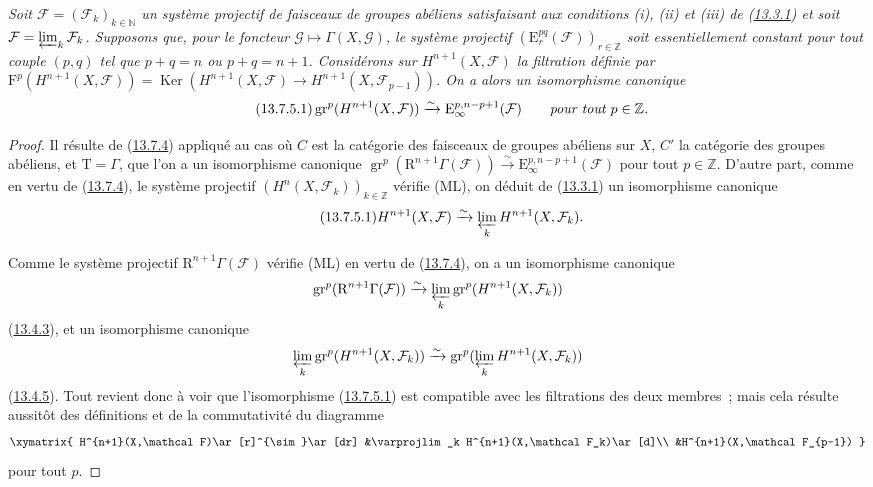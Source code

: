 \begin{corollary}[13.7.5]
\label{0.13.7.5-fr}
\emph{Soit $\mathcal F=(\mathcal F_k)_{k\in\mathbb N}$ un système
projectif de faisceaux de groupes abéliens satisfaisant aux conditions
\emph{(i)}, \emph{(ii)} et \emph{(iii)} de
(\hyperref[0.13.3.1-fr]{13.3.1}) et soit
$\mathcal F=\varprojlim_k\mathcal F_k$. Supposons que, pour le foncteur
$\mathcal G\mapsto\Gamma(X,\mathcal G)$, le système projectif
$(\mathrm E_r^{pq}(\mathcal F))_{r\in\mathbb Z}$ soit essentiellement
constant pour tout couple $(p,q)$ tel que $p+q=n$ ou $p+q=n+1$.
Considérons sur $H^{n+1}(X,\mathcal F)$ la filtration définie par
$\mathrm F^p(H^{n+1}(X,\mathcal F))=
\operatorname{Ker}(H^{n+1}(X,\mathcal F)\to
H^{n+1}(X,\mathcal F_{p-1}))$. On a alors un isomorphisme canonique}
\begin{equation}
\label{0.13.7.5.1-fr}
\tag{13.7.5.1}
\operatorname{gr}^p(H^{n+1}(X,\mathcal F))
\xrightarrow{\sim}\mathrm E_\infty^{p,n-p+1}(\mathcal F)
\qquad\emph{pour tout $p\in\mathbb Z$.}
\end{equation}
\end{corollary}
\begin{proof}
Il résulte de (\hyperref[0.13.7.4-fr]{13.7.4}) appliqué au cas où $C$
est la catégorie des faisceaux de groupes abéliens sur $X$, $C'$ la
catégorie des groupes abéliens, et $\mathrm T=\Gamma$, que l'on a un
isomorphisme canonique
$\operatorname{gr}^p(\mathrm R^{n+1}\Gamma(\mathcal F))
\xrightarrow{\sim}\mathrm E_\infty^{p,n-p+1}(\mathcal F)$ pour tout
$p\in\mathbb Z$. D'autre part, comme en vertu de
(\hyperref[0.13.7.4-fr]{13.7.4}), le système projectif
$(H^n(X,\mathcal F_k))_{k\in\mathbb Z}$ vérifie (ML), on déduit de
(\hyperref[0.13.3.1-fr]{13.3.1}) un isomorphisme canonique
\begin{equation}
\label{0.13.7.5.1b-fr}
\tag{13.7.5.1}
H^{n+1}(X,\mathcal F)\xrightarrow{\sim}
\varprojlim_k H^{n+1}(X,\mathcal F_k).
\end{equation}

Comme le système projectif $\mathrm R^{n+1}\Gamma(\mathcal F)$ vérifie
(ML) en vertu de (\hyperref[0.13.7.4-fr]{13.7.4}), on a un isomorphisme
canonique
\[
\operatorname{gr}^p(\mathrm R^{n+1}\Gamma(\mathcal F))
\xrightarrow{\sim}
\varprojlim_k\operatorname{gr}^p(H^{n+1}(X,\mathcal F_k))
\]
(\hyperref[0.13.4.3-fr]{13.4.3}), et un isomorphisme canonique
\[
\varprojlim_k\operatorname{gr}^p(H^{n+1}(X,\mathcal F_k))
\xrightarrow{\sim}
\operatorname{gr}^p(\varprojlim_k H^{n+1}(X,\mathcal F_k))
\]
(\hyperref[0.13.4.5-fr]{13.4.5}). Tout revient donc à voir que
l'isomorphisme (\hyperref[0.13.7.5.1-fr]{13.7.5.1}) est compatible avec
les filtrations des deux membres~; mais cela résulte aussitôt des
définitions et de la commutativité du diagramme
\[
\xymatrix{
H^{n+1}(X,\mathcal F)\ar[r]^{\sim}\ar[dr]
&\varprojlim_k H^{n+1}(X,\mathcal F_k)\ar[d]\\
&H^{n+1}(X,\mathcal F_{p-1})
}
\]
pour tout $p$.
\end{proof}

